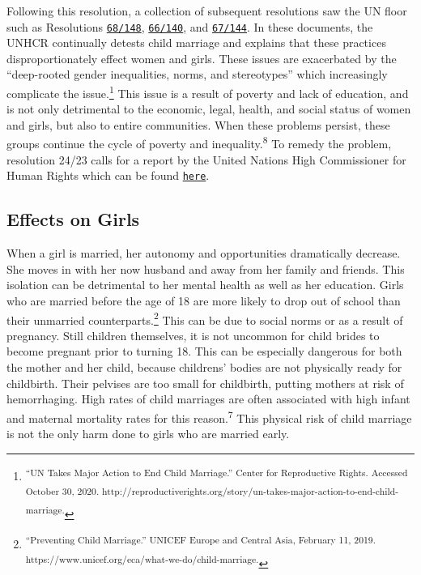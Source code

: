 \documentclass[10pt, letterpaper]{article}
\begin{document}
Following this resolution, a collection of subsequent resolutions saw
the UN floor such as Resolutions
\texttt{\href{https://documents-dds-ny.un.org/doc/UNDOC/GEN/N13/448/33/PDF/N1344833.pdf?OpenElement}{{68/148}}},
\texttt{\href{https://www.un.org/en/development/desa/population/migration/generalassembly/docs/globalcompact/A_RES_66_140.pdf}{{66/140}}},
and \texttt{\href{https://undocs.org/A/RES/67/144}{{67/144}}}. In these
documents, the UNHCR continually detests child marriage and explains
that these practices disproportionately effect women and girls. These
issues are exacerbated by the ``deep-rooted gender inequalities, norms,
and stereotypes'' which increasingly complicate the issue.\footnote{\textsuperscript{``UN
  Takes Major Action to End Child Marriage.'' Center for Reproductive
  Rights. Accessed October 30, 2020.
  http://reproductiverights.org/story/un-takes-major-action-to-end-child-marriage.}}
This issue is a result of poverty and lack of education, and is not only
detrimental to the economic, legal, health, and social status of women
and girls, but also to entire communities. When these problems persist,
these groups continue the cycle of poverty and
inequality.\textsuperscript{8} To remedy the problem, resolution 24/23
calls for a report by the United Nations High Commissioner for Human
Rights which can be found
\texttt{\href{https://www.ohchr.org/EN/HRBodies/HRC/RegularSessions/Session26/Documents/A-HRC-26-22_en.doc}{{here}}}.

\subsection{Effects on Girls}

When a girl is married, her autonomy and opportunities dramatically
decrease. She moves in with her now husband and away from her family and
friends. This isolation can be detrimental to her mental health as well
as her education. Girls who are married before the age of 18 are more
likely to drop out of school than their unmarried
counterparts.\footnote{\textsuperscript{``Preventing Child Marriage.''
  UNICEF Europe and Central Asia, February 11, 2019.
  https://www.unicef.org/eca/what-we-do/child-marriage.}} This can be
due to social norms or as a result of pregnancy. Still children
themselves, it is not uncommon for child brides to become pregnant prior
to turning 18. This can be especially dangerous for both the mother and
her child, because childrens' bodies are not physically ready for
childbirth. Their pelvises are too small for childbirth, putting mothers
at risk of hemorrhaging. High rates of child marriages are often
associated with high infant and maternal mortality rates for this
reason.\textsuperscript{7} This physical risk of child marriage is not
the only harm done to girls who are married early. \\
\end{document}
